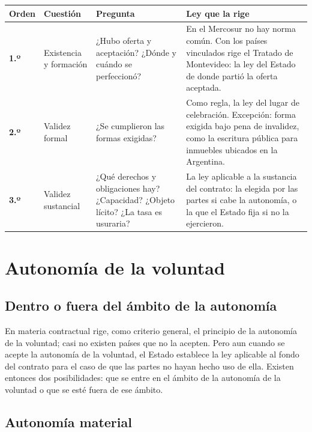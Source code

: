 \documentclass[12pt,oneside]{book}
\begin{document}
\begin{table}[H]
\centering
\footnotesize
\setlength{\tabcolsep}{4pt}
\begin{tabular}{@{}L{0.09\textwidth}L{0.17\textwidth}L{0.24\textwidth}L{0.38\textwidth}@{}}
\toprule
\textbf{Orden} & \textbf{Cuestión} & \textbf{Pregunta} & \textbf{Ley que la rige} \\
\midrule
\textbf{1.º} & Existencia y formación & ¿Hubo oferta y aceptación? ¿Dónde y cuándo se perfeccionó? & En el Mercosur no hay norma común. Con los países vinculados rige el Tratado de Montevideo: la ley del Estado de donde partió la oferta aceptada. \\
\addlinespace
\textbf{2.º} & Validez formal & ¿Se cumplieron las formas exigidas? & Como regla, la ley del lugar de celebración. Excepción: forma exigida bajo pena de invalidez, como la escritura pública para inmuebles ubicados en la Argentina. \\
\addlinespace
\textbf{3.º} & Validez sustancial & ¿Qué derechos y obligaciones hay? ¿Capacidad? ¿Objeto lícito? ¿La tasa es usuraria? & La ley aplicable a la sustancia del contrato: la elegida por las partes si cabe la autonomía, o la que el Estado fija si no la ejercieron. \\
\bottomrule
\end{tabular}
\end{table}

\section{Autonomía de la voluntad}

\subsection{Dentro o fuera del ámbito de la autonomía}

En materia contractual rige, como criterio general, el principio de la autonomía de la voluntad; casi no existen países que no la acepten. Pero aun cuando se acepte la autonomía de la voluntad, el Estado establece la ley aplicable al fondo del contrato para el caso de que las partes no hayan hecho uso de ella. Existen entonces dos posibilidades: que se entre en el ámbito de la autonomía de la voluntad o que se esté fuera de ese ámbito.

\subsection{Autonomía material}
\end{document}
